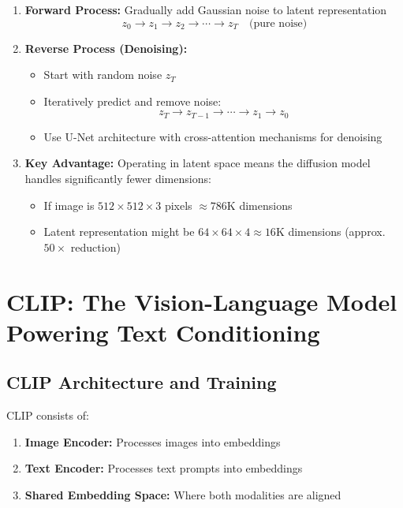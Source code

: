 \begin{enumerate}
    \item \textbf{Forward Process:} Gradually add Gaussian noise to latent representation
    \[
    z_0 \rightarrow z_1 \rightarrow z_2 \rightarrow \cdots \rightarrow z_T \quad \text{(pure noise)}
    \]

    \item \textbf{Reverse Process (Denoising):}
    \begin{itemize}
        \item Start with random noise $z_T$
        \item Iteratively predict and remove noise:
        \[
        z_T \rightarrow z_{T-1} \rightarrow \cdots \rightarrow z_1 \rightarrow z_0
        \]
        \item Use U-Net architecture with cross-attention mechanisms for denoising
    \end{itemize}

    \item \textbf{Key Advantage:} Operating in latent space means the diffusion model handles significantly fewer dimensions:
    \begin{itemize}
        \item If image is $512 \times 512 \times 3$ pixels $\approx 786$K dimensions
        \item Latent representation might be $64 \times 64 \times 4 \approx 16$K dimensions (approx. $50\times$ reduction)
    \end{itemize}
\end{enumerate}

\section{CLIP: The Vision-Language Model Powering Text Conditioning}

\subsection*{CLIP Architecture and Training}
CLIP consists of:
\begin{enumerate}
    \item \textbf{Image Encoder:} Processes images into embeddings
    \item \textbf{Text Encoder:} Processes text prompts into embeddings
    \item \textbf{Shared Embedding Space:} Where both modalities are aligned
\end{enumerate}

